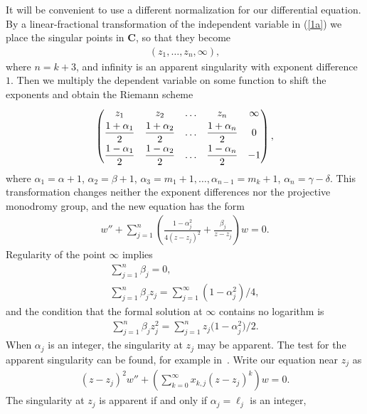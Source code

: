 \documentclass[pdftex]{sigma}
\numberwithin{equation}{section}
\def\C{\mathbf{C}}
\def\lc{,\allowbreak\ldots,\allowbreak}
\let\ds\displaystyle
\begin{document}
It will be convenient to use a different normalization for our differential equation. By a linear-fractional transformation of the independent variable in (\ref{1a}) we place the singular points in $\C$, so that they become
\begin{gather*}
(z_1,\ldots,z_n,\infty),
\end{gather*}
where $n=k+3$, and infinity is an apparent singularity with exponent difference $1$. Then we multiply the dependent variable on some function to shift the exponents and obtain the Riemann scheme
\begin{gather}\label{rs}
\left(\begin{matrix}z_1&z_2&\ldots&z_n&\infty\vspace{1mm}\\
\ds\frac{1+\alpha_1}{2}&\ds\frac{1+\alpha_2}{2}&\ds\ldots&
\ds\frac{1+\alpha_n}{2}& 0\vspace{1mm}\\
\ds\frac{1-\alpha_1}{2}&\ds\frac{1-\alpha_2}{2}&\ds\ldots&
\ds\frac{1-\alpha_n}{2}&-1\end{matrix}\right),
\end{gather}
where $\alpha_1=\alpha+1$, $\alpha_2=\beta+1$, $\alpha_3=m_1+1\lc \alpha_{n-1}=m_k+1$, $\alpha_n=\gamma-\delta$. This transformation changes neither the exponent differences nor the projective monodromy group, and the new equation has the form
\begin{gather}\label{1b}
w''+\sum_{j=1}^n\left(\frac{1-\alpha_j^2}{4(z-z_j)^2} +\frac{\beta_j}{z-z_j}\right)w=0.
\end{gather}
Regularity of the point $\infty$ implies
\begin{gather}\label{1}
\sum_{j=1}^n\beta_j=0,\\
\label{2}
\sum_{j=1}^n\beta_jz_j=\sum_{j=1}^\infty(1-\alpha_j^2)/4,
\end{gather}
and the condition that the formal solution at $\infty$ contains no logarithm is
\begin{gather}\label{3a}
\sum_{j=1}^n\beta_jz_j^2=\sum_{j=1}^n z_j\big(1-\alpha_j^2\big)/2.
\end{gather}
When $\alpha_j$ is an integer, the singularity at $z_j$ may be apparent. The test for the apparent singularity can be found, for example in~\cite{TL}. Write our equation near $z_j$ as
\begin{gather*}
(z-z_j)^2w''+\left(\sum_{k=0}^\infty x_{k,j}(z-z_j)^k\right)w=0.
\end{gather*}
The singularity at $z_j$ is apparent if and only if
$\alpha_j=\ell_j$ is an integer,
\end{document}

